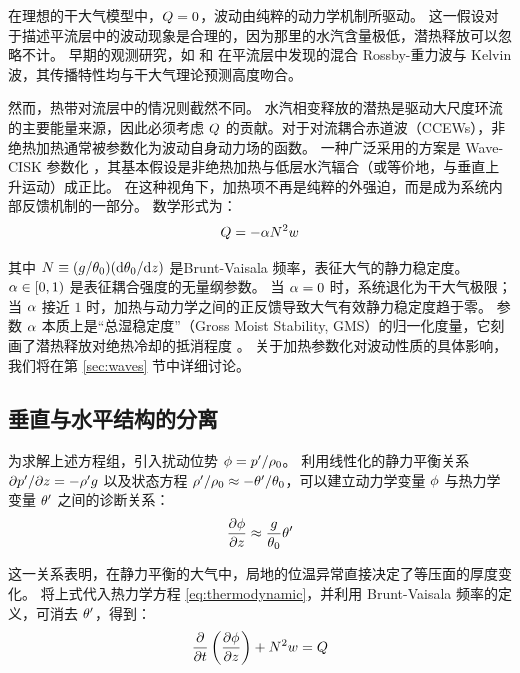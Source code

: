 在理想的干大气模型中，$Q = 0$，波动由纯粹的动力学机制所驱动。
这一假设对于描述平流层中的波动现象是合理的，因为那里的水汽含量极低，潜热释放可以忽略不计。
早期的观测研究，如 \citep{Yanai1966} 和 \citep{Wallace1968} 在平流层中发现的混合 Rossby-重力波与 Kelvin 波，其传播特性均与干大气理论预测高度吻合。

然而，热带对流层中的情况则截然不同。
水汽相变释放的潜热是驱动大尺度环流的主要能量来源，因此必须考虑 $Q$ 的贡献。对于对流耦合赤道波（CCEWs），非绝热加热通常被参数化为波动自身动力场的函数。
一种广泛采用的方案是 Wave-CISK 参数化 \citep{lindzenWaveCISKTropics1974}，其基本假设是非绝热加热与低层水汽辐合（或等价地，与垂直上升运动）成正比。
在这种视角下，加热项不再是纯粹的外强迫，而是成为系统内部反馈机制的一部分。
数学形式为：
\begin{equation}
    Q = -\alpha N^2 w
    \label{eq:heating_param}
\end{equation}

其中 $N \equiv (g/\theta_0)(\mathrm{d}\theta_0/\mathrm{d}z)$ 是Brunt-Vaisala 频率，表征大气的静力稳定度。
$\alpha \in [0, 1)$ 是表征耦合强度的无量纲参数。
当 $\alpha = 0$ 时，系统退化为干大气极限；当 $\alpha$ 接近 $1$ 时，加热与动力学之间的正反馈导致大气有效静力稳定度趋于零。
参数 $\alpha$ 本质上是“总湿稳定度”（Gross Moist Stability, GMS）的归一化度量，它刻画了潜热释放对绝热冷却的抵消程度 \citep{kiladisConvectivelyCoupledEquatorial2009}。
关于加热参数化对波动性质的具体影响，我们将在第 \ref{sec:waves} 节中详细讨论。

\subsection{垂直与水平结构的分离}
\label{subsec:separation}

为求解上述方程组，引入扰动位势 $\phi = p^\prime / \rho_0$。
利用线性化的静力平衡关系 $\partial p^\prime/\partial z = -\rho^\prime g$ 以及状态方程 $\rho^\prime/\rho_0 \approx -\theta^\prime/\theta_0$，可以建立动力学变量 $\phi$ 与热力学变量 $\theta^\prime$ 之间的诊断关系：
\begin{equation}
    \pde{\gravpotential}{z} \approx \frac{\gravityconst}{\ptemp_0} \ptemp^\prime
    \label{eq:hydrostatic_relation}
\end{equation}

这一关系表明，在静力平衡的大气中，局地的位温异常直接决定了等压面的厚度变化。
将上式代入热力学方程 \eqref{eq:thermodynamic}，并利用 Brunt-Vaisala 频率的定义，可消去 $\theta^\prime$，得到：
\begin{equation}
    \pde{}{\timevar}\left(\pde{\gravpotential}{z}\right) + \bvfreq^2 w = \nonadheat
    \label{eq:thermo_phi}
\end{equation}

